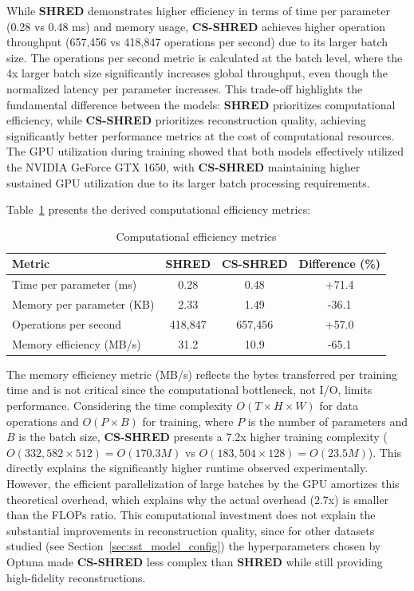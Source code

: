 While \textbf{SHRED} demonstrates higher efficiency in terms of time per parameter (0.28 vs 0.48 ms) and memory usage, \textbf{CS-SHRED} achieves higher operation throughput (657,456 vs 418,847 operations per second) due to its larger batch size. The operations per second metric is calculated at the batch level, where the 4x larger batch size significantly increases global throughput, even though the normalized latency per parameter increases. This trade-off highlights the fundamental difference between the models: \textbf{SHRED} prioritizes computational efficiency, while \textbf{CS-SHRED} prioritizes reconstruction quality, achieving significantly better performance metrics at the cost of computational resources. The GPU utilization during training showed that both models effectively utilized the NVIDIA GeForce GTX 1650, with \textbf{CS-SHRED} maintaining higher sustained GPU utilization due to its larger batch processing requirements.

Table~\ref{tab:computational_efficiency} presents the derived computational efficiency metrics:

\begin{table}[h]
\centering
\caption{Computational efficiency metrics}
\label{tab:computational_efficiency}
\begin{tabular}{|l|c|c|c|}
\hline
\textbf{Metric} & \textbf{SHRED} & \textbf{CS-SHRED} & \textbf{Difference (\%)} \\
\hline
Time per parameter (ms) & 0.28 & 0.48 & +71.4 \\
Memory per parameter (KB) & 2.33 & 1.49 & -36.1 \\
Operations per second & 418,847 & 657,456 & +57.0 \\
Memory efficiency (MB/s) & 31.2 & 10.9 & -65.1 \\
\hline
\end{tabular}
\end{table}

The memory efficiency metric (MB/s) reflects the bytes transferred per training time and is not critical since the computational bottleneck, not I/O, limits performance. Considering the time complexity $O(T \times H \times W)$ for data operations and $O(P \times B)$ for training, where $P$ is the number of parameters and $B$ is the batch size, \textbf{CS-SHRED} presents a 7.2x higher training complexity ($O(332,582 \times 512) = O(170.3M)$ vs $O(183,504 \times 128) = O(23.5M)$). This directly explains the significantly higher runtime observed experimentally. However, the efficient parallelization of large batches by the GPU amortizes this theoretical overhead, which explains why the actual overhead (2.7x) is smaller than the FLOPs ratio. This computational investment does not explain the substantial improvements in reconstruction quality, since for other datasets studied (see Section~\ref{sec:sst_model_config}) the hyperparameters chosen by Optuna made \textbf{CS-SHRED} less complex than \textbf{SHRED} while still providing high-fidelity reconstructions.

